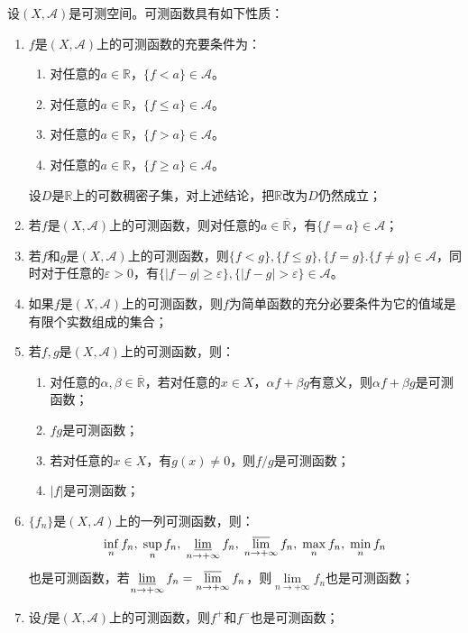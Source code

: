 \begin{property}\label{prop:MeasurableFunction}
	设$(X,\mathscr{A})$是可测空间。可测函数具有如下性质：
	\begin{enumerate}
		\item $f$是$(X,\mathscr{A})$上的可测函数的充要条件为：
		\begin{enumerate}
			\item 对任意的$a\in\mathbb{R}$，$\{f<a\}\in\mathscr{A}$。
			\item 对任意的$a\in\mathbb{R}$，$\{f\leqslant a\}\in\mathscr{A}$。
			\item 对任意的$a\in\mathbb{R}$，$\{f>a\}\in\mathscr{A}$。
			\item 对任意的$a\in\mathbb{R}$，$\{f\geqslant a\}\in\mathscr{A}$。
		\end{enumerate}
		设$D$是$\mathbb{R}$上的可数稠密子集，对上述结论，把$\mathbb{R}$改为$D$仍然成立；
		\item 若$f$是$(X,\mathscr{A})$上的可测函数，则对任意的$a\in\overline{\mathbb{R}^{}}$，有$\{f=a\}\in\mathscr{A}$；
		\item 若$f$和$g$是$(X,\mathscr{A})$上的可测函数，则$\{f<g\},\{f\leqslant g\},\{f=g\}.\{f\ne g\}\in\mathscr{A}$，同时对于任意的$\varepsilon>0$，有$\{|f-g|\geqslant\varepsilon\},\{|f-g|>\varepsilon\}\in \mathscr{A}$。
		\item 如果$f$是$(X,\mathscr{A})$上的可测函数，则$f$为简单函数的充分必要条件为它的值域是有限个实数组成的集合；
		\item 若$f,g$是$(X,\mathscr{A})$上的可测函数，则：
		\begin{enumerate}
			\item 对任意的$\alpha,\beta\in\overline{\mathbb{R}}$，若对任意的$x\in X$，$\alpha f+\beta g$有意义，则$\alpha f+\beta g$是可测函数；
			\item $fg$是可测函数；
			\item 若对任意的$x\in X$，有$g(x)\ne0$，则$f/g$是可测函数；
			\item $|f|$是可测函数；
		\end{enumerate}
		\item $\{f_n\}$是$(X,\mathscr{A})$上的一列可测函数，则：
		\begin{equation*}
			\inf_nf_n,\;\sup_nf_n,\;
			\varliminf_{n\to+\infty}f_n,\;\varlimsup_{n\to+\infty}f_n,\;\max_nf_n,\;\min_nf_n
		\end{equation*}
		也是可测函数，若$\varliminf\limits_{n\to+\infty}f_n=\varlimsup\limits_{n\to+\infty}f_n$，则$\lim\limits_{n\to+\infty}f_n$也是可测函数；
		\item 设$f$是$(X,\mathscr{A})$上的可测函数，则$f^+$和$f^-$也是可测函数；

\end{enumerate}
\end{property}
